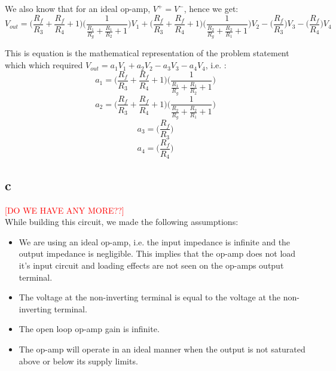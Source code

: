 \documentclass{article}
\newcommand{\xxx}[1]{\textcolor{red}{#1}}
\theoremstyle{plain}
\theoremstyle{definition}
\theoremstyle{remark}
\begin{document}
We also know that for an ideal op-amp, $V^+ = V^-$, hence we get:
$$ V_{out} = \Big( \frac{R_f}{R_3} + \frac{ R_f}{R_4} + 1\Big) \Big( \frac{1}{\frac{R_1}{R_g} + \frac{R_1}{R_2} + 1}\Big) V_1 + \Big( \frac{R_f}{R_3} + \frac{ R_f}{R_4} + 1\Big) \Big( \frac{1}{\frac{R_2}{R_g} + \frac{R_2}{R_1} + 1} \Big) V_2 - \Big( \frac{R_f}{R_3}\Big)V_3 - \Big( \frac{ R_f}{R_4}\Big)V_4$$

This is equation is the mathematical representation of the problem statement which which required $V_{out} = a_1V_1 + a_2 V_2 - a_3 V_3 - a_4 V_4$, i.e. :
$$a_1 =  \Big( \frac{R_f}{R_3} + \frac{ R_f}{R_4} + 1\Big) \Big( \frac{1}{\frac{R_1}{R_g} + \frac{R_1}{R_2} + 1}\Big)$$
$$a_2 =  \Big( \frac{R_f}{R_3} + \frac{ R_f}{R_4} + 1\Big) \Big( \frac{1}{\frac{R_2}{R_g} + \frac{R_2}{R_1} + 1} \Big) $$
$$a_3 = \Big( \frac{R_f}{R_3}\Big)$$
$$a_4 = \Big( \frac{ R_f}{R_4}\Big)$$

\subsection*{c}
\xxx{[DO WE HAVE ANY MORE??]}\\
While building this circuit, we made the following assumptions:
\begin{itemize}
\item We are using an ideal op-amp, i.e. the input impedance is infinite and the output impedance is negligible. This implies that the op-amp does not load it's input circuit and loading effects are not seen on the op-amps output terminal.

\item The voltage at the non-inverting terminal is equal to the voltage at the non-inverting terminal.

\item The open loop op-amp gain is infinite.

\item The op-amp will operate in an ideal manner when the output is not saturated above or below its supply limits.

\end{itemize}
\end{document}
